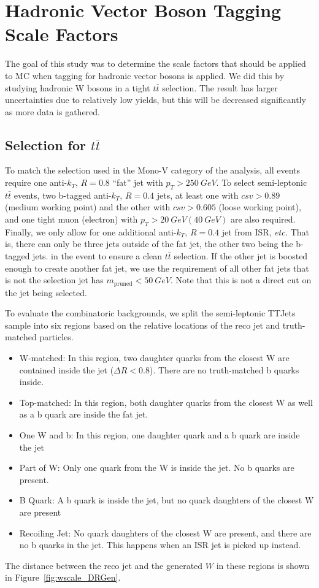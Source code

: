 \documentclass{article}
\begin{document}
\section{Hadronic Vector Boson Tagging Scale Factors} \label{sec:wscale}

The goal of this study was to determine the scale factors that should
be applied to MC when tagging for hadronic vector bosons is applied.
We did this by studying hadronic W bosons in a tight $t\bar{t}$ selection.
The result has larger uncertainties due to relatively low yields,
but this will be decreased significantly as more data is gathered.

\subsection{Selection for $t\bar{t}$} \label{sec:wscale_selection}

To match the selection used in the Mono-V category of the analysis,
all events require one anti-$k_T$, $R = 0.8$ ``fat'' jet with $p_T > \SI{250}{GeV}$.
To select semi-leptonic $t\bar{t}$ events, two b-tagged anti-$k_T$, $R = 0.4$ jets,
at least one with $csv > 0.89$ (medium working point)
and the other with $csv > 0.605$ (loose working point),
and one tight muon (electron) with
$p_T > \SI{20}{GeV} (\SI{40}{GeV})$ are also required.
Finally, we only allow for one additional anti-$k_T$, $R = 0.4$ jet from ISR, \emph{etc.}
That is, there can only be three jets outside of the fat jet, the other two being
the b-tagged jets.
in the event to ensure a clean $t\bar{t}$ selection.
If the other jet is boosted enough to create another fat jet, we use the requirement 
of all other fat jets that is not the selection jet has $m_\text{pruned} < \SI{50}{GeV}$.
Note that this is not a direct cut on the jet being selected.

To evaluate the combinatoric backgrounds, we split the semi-leptonic TTJets sample into six regions
based on the relative locations of the reco jet and truth-matched particles.
\begin{itemize}
\item W-matched: In this region, two daughter quarks from the closest W are contained inside the jet
  ($\Delta R < 0.8$). There are no truth-matched b quarks inside.
\item Top-matched: In this region, both daughter quarks from the closest W as well as a b quark are
  inside the fat jet.
\item One W and b: In this region, one daughter quark and a b quark are inside the jet
\item Part of W: Only one quark from the W is inside the jet. No b quarks are present.
\item B Quark: A b quark is inside the jet, but no quark daughters of the closest W are present
\item Recoiling Jet: No quark daughters of the closest W are present, and there are no b quarks in the jet.
  This happens when an ISR jet is picked up instead.
\end{itemize}
The distance between the reco jet and the generated $W$
in these regions is shown in Figure~\ref{fig:wscale_DRGen}.
\end{document}
